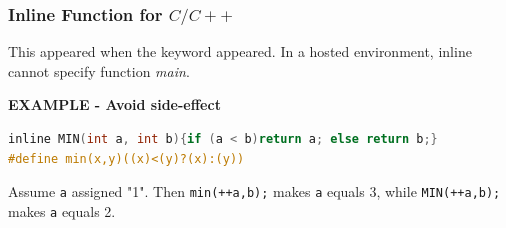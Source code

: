 \subsubsection{Inline Function for $C/C++$}

This appeared when the keyword  appeared. In a hosted environment, inline cannot specify function \textit{main}.

\textbf{EXAMPLE - Avoid side-effect}

\lstset{style=GlobalC}
\begin{lstlisting}[language=C]
inline MIN(int a, int b){if (a < b)return a; else return b;}
#define min(x,y)((x)<(y)?(x):(y))
\end{lstlisting}

Assume \verb|a| assigned "1". Then \verb|min(++a,b);| makes \verb|a| equals 3, while \verb|MIN(++a,b);| makes \verb|a| equals 2.

